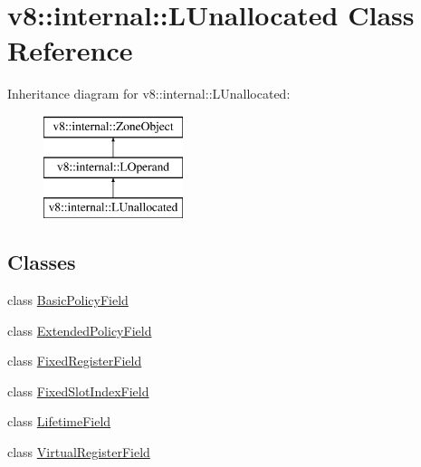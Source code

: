 \hypertarget{classv8_1_1internal_1_1_l_unallocated}{}\section{v8\+:\+:internal\+:\+:L\+Unallocated Class Reference}
\label{classv8_1_1internal_1_1_l_unallocated}
Inheritance diagram for v8\+:\+:internal\+:\+:L\+Unallocated\+:\begin{figure}[H]
\begin{center}
\leavevmode
\includegraphics[height=3.000000cm]{classv8_1_1internal_1_1_l_unallocated}
\end{center}
\end{figure}
\subsection*{Classes}
\begin{DoxyCompactItemize}
\item 
class \hyperlink{classv8_1_1internal_1_1_l_unallocated_1_1_basic_policy_field}{Basic\+Policy\+Field}
\item 
class \hyperlink{classv8_1_1internal_1_1_l_unallocated_1_1_extended_policy_field}{Extended\+Policy\+Field}
\item 
class \hyperlink{classv8_1_1internal_1_1_l_unallocated_1_1_fixed_register_field}{Fixed\+Register\+Field}
\item 
class \hyperlink{classv8_1_1internal_1_1_l_unallocated_1_1_fixed_slot_index_field}{Fixed\+Slot\+Index\+Field}
\item 
class \hyperlink{classv8_1_1internal_1_1_l_unallocated_1_1_lifetime_field}{Lifetime\+Field}
\item 
class \hyperlink{classv8_1_1internal_1_1_l_unallocated_1_1_virtual_register_field}{Virtual\+Register\+Field}
\end{DoxyCompactItemize}
